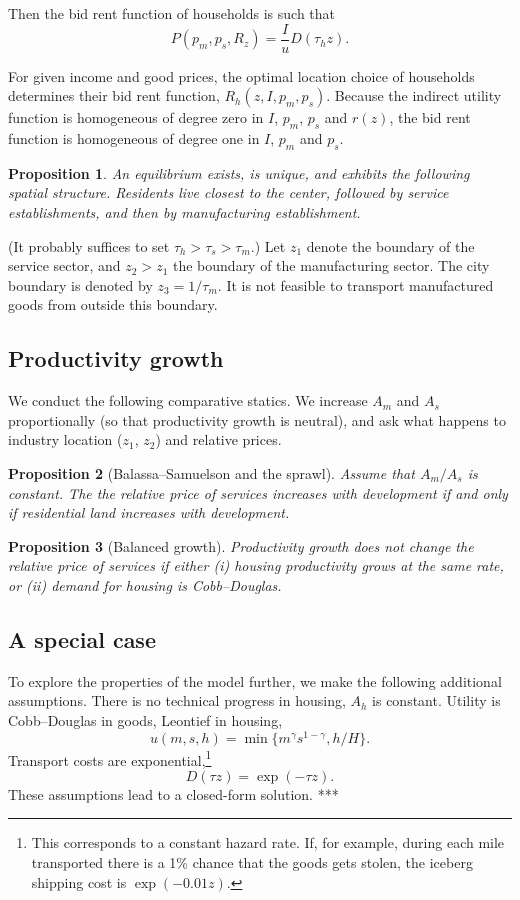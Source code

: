 \documentclass[12pt]{article}
\newtheorem{proposition}{Proposition}
\begin{document}
Then the bid rent function of households is such that
\[
P(p_m,p_s,R_z) = \frac Iu  D(\tau_h z).
\]

For given income and good prices, the optimal location choice of households determines their bid rent function, $R_h(z,I,p_m,p_s)$. Because the indirect utility function is homogeneous of degree zero in $I$, $p_m$, $p_s$ and $r(z)$, the bid rent function is homogeneous of degree one in $I$, $p_m$ and $p_s$.

\begin{proposition}
An equilibrium exists, is unique, and exhibits the following spatial structure. Residents live closest to the center, followed by service establishments, and then by manufacturing establishment. 
\end{proposition}

(It probably suffices to set $\tau_h>\tau_s>\tau_m$.) Let $z_1$ denote the boundary of the service sector, and $z_2>z_1$ the boundary of the manufacturing sector. The city boundary is denoted by $z_3 = 1/\tau_m$. It is not feasible to transport manufactured goods from outside this boundary.

\subsection{Productivity growth}
We conduct the following comparative statics. We increase $A_m$ and $A_s$ proportionally (so that productivity growth is neutral), and ask what happens to industry location ($z_1$, $z_2$) and relative prices.
\begin{proposition}[Balassa--Samuelson and the sprawl]
 Assume that $A_m/A_s$ is constant. The the relative price of services increases with development if and only if residential land increases with development.
\end{proposition}

\begin{proposition}[Balanced growth]
Productivity growth does not change the relative price of services if either
      (i) housing productivity grows at the same rate,
      or (ii) demand for housing is Cobb--Douglas.
\end{proposition}

\subsection{A special case}
To explore the properties of the model further, we make the following additional assumptions. 
There is no technical progress in housing, $A_h$ is constant. Utility is Cobb--Douglas in goods, Leontief in housing,
\[
u(m,s,h) = \min\{m^\gamma s^{1-\gamma} ,h/H\}.
\]
Transport costs are exponential,\footnote{This corresponds to a constant hazard rate. If, for example, during each mile transported there is a 1\% chance that the goods gets stolen, the iceberg shipping cost is $\exp(-0.01 z)$.}
\[
D(\tau z) = \exp(-\tau z).
\]
These assumptions lead to a closed-form solution. ***
\end{document}

